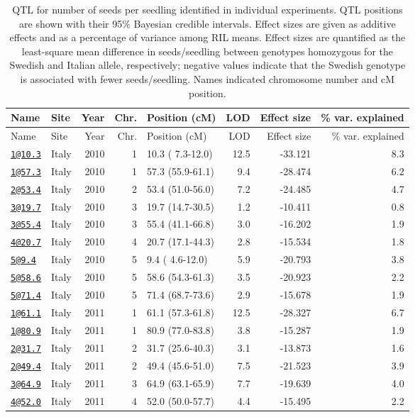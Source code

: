 \documentclass[]{article}
\begin{document}
\begin{longtable}[]{@{}llrrlrrr@{}}
\caption{\label{tab:individual-tfit-qtl}QTL for number of seeds per seedling identified in individual experiments. QTL positions are shown with their 95\% Bayesian credible intervals. Effect sizes are given as additive effects and as a percentage of variance among RIL means. Effect sizes are quantified as the least-square mean difference in seeds/seedling between genotypes homozygous for the Swedish and Italian allele, respectively; negative values indicate that the Swedish genotype is associated with fewer seeds/seedling. Names indicated chromosome number and cM position.}\tabularnewline
\toprule
Name & Site & Year & Chr. & Position (cM) & LOD & Effect size & \% var. explained\tabularnewline
\midrule
\endfirsthead
\toprule
Name & Site & Year & Chr. & Position (cM) & LOD & Effect size & \% var. explained\tabularnewline
\midrule
\endhead
\href{mailto:1@10.3}{\nolinkurl{1@10.3}} & Italy & 2010 & 1 & 10.3 ( 7.3-12.0) & 12.5 & -33.121 & 8.3\tabularnewline
\href{mailto:1@57.3}{\nolinkurl{1@57.3}} & Italy & 2010 & 1 & 57.3 (55.9-61.1) & 9.4 & -28.474 & 6.2\tabularnewline
\href{mailto:2@53.4}{\nolinkurl{2@53.4}} & Italy & 2010 & 2 & 53.4 (51.0-56.0) & 7.2 & -24.485 & 4.7\tabularnewline
\href{mailto:3@19.7}{\nolinkurl{3@19.7}} & Italy & 2010 & 3 & 19.7 (14.7-30.5) & 1.2 & -10.411 & 0.8\tabularnewline
\href{mailto:3@55.4}{\nolinkurl{3@55.4}} & Italy & 2010 & 3 & 55.4 (41.1-66.8) & 3.0 & -16.202 & 1.9\tabularnewline
\href{mailto:4@20.7}{\nolinkurl{4@20.7}} & Italy & 2010 & 4 & 20.7 (17.1-44.3) & 2.8 & -15.534 & 1.8\tabularnewline
\href{mailto:5@9.4}{\nolinkurl{5@9.4}} & Italy & 2010 & 5 & 9.4 ( 4.6-12.0) & 5.9 & -20.793 & 3.8\tabularnewline
\href{mailto:5@58.6}{\nolinkurl{5@58.6}} & Italy & 2010 & 5 & 58.6 (54.3-61.3) & 3.5 & -20.923 & 2.2\tabularnewline
\href{mailto:5@71.4}{\nolinkurl{5@71.4}} & Italy & 2010 & 5 & 71.4 (68.7-73.6) & 2.9 & -15.678 & 1.9\tabularnewline
\href{mailto:1@61.1}{\nolinkurl{1@61.1}} & Italy & 2011 & 1 & 61.1 (57.3-61.8) & 12.5 & -28.327 & 6.7\tabularnewline
\href{mailto:1@80.9}{\nolinkurl{1@80.9}} & Italy & 2011 & 1 & 80.9 (77.0-83.8) & 3.8 & -15.287 & 1.9\tabularnewline
\href{mailto:2@31.7}{\nolinkurl{2@31.7}} & Italy & 2011 & 2 & 31.7 (25.6-40.3) & 3.1 & -13.873 & 1.6\tabularnewline
\href{mailto:2@49.4}{\nolinkurl{2@49.4}} & Italy & 2011 & 2 & 49.4 (45.6-51.0) & 7.5 & -21.523 & 3.9\tabularnewline
\href{mailto:3@64.9}{\nolinkurl{3@64.9}} & Italy & 2011 & 3 & 64.9 (63.1-65.9) & 7.7 & -19.639 & 4.0\tabularnewline
\href{mailto:4@52.0}{\nolinkurl{4@52.0}} & Italy & 2011 & 4 & 52.0 (50.0-57.7) & 4.4 & -15.495 & 2.2\tabularnewline

\end{longtable}
\end{document}
